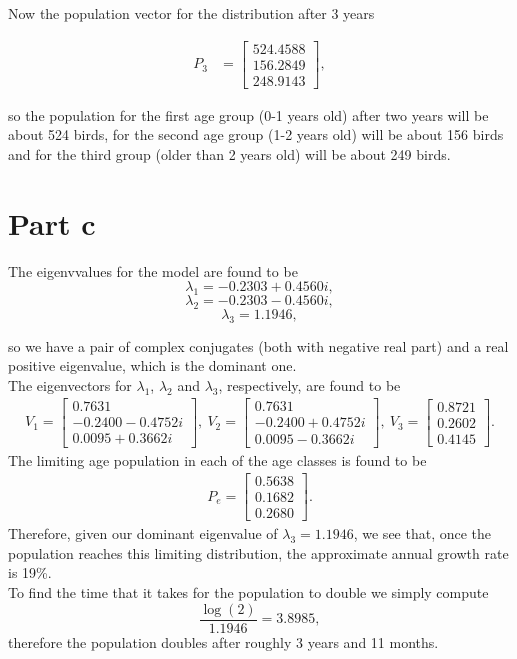 Now the population vector for the distribution after 3 years

\begin{align}
\textbf{$P_{3}$} &= \begin{bmatrix}
524.4588\\
156.2849\\
248.9143
\end{bmatrix},
\end{align}

so the population for the first age group (0-1 years old) after two years will be about 524 birds, for the second age group (1-2 years old) will be about 156 birds and for the third group (older than 2 years old) will be about 249 birds.\\

\section{Part c}
The eigenvvalues for the model are found to be
$$
\lambda_{1} = -0.2303 + 0.4560i,
$$
$$
\lambda_{2} = -0.2303 - 0.4560i,
$$
$$
\lambda_{3} = 1.1946,
$$

so we have a pair of complex conjugates (both with negative real part) and a real positive eigenvalue, which is the dominant one.\\
The eigenvectors for $\lambda_{1}$, $\lambda_{2}$ and $\lambda_{3}$, respectively, are found to be
\begin{align*}                                     \textbf{$V_{1}$} = \begin{bmatrix} 
0.7631\\
-0.2400 - 0.4752i \\
0.0095 + 0.3662i
\end{bmatrix},\
\textbf{$V_{2}$} = \begin{bmatrix}
0.7631 \\
-0.2400 + 0.4752i \\
0.0095 - 0.3662i
\end{bmatrix},\
\textbf{$V_{3}$} = \begin{bmatrix}
0.8721 \\
0.2602 \\
0.4145
\end{bmatrix}.
\end{align*}
The limiting age population in each of the age classes is found to be
\begin{align*}                                     \textbf{$P_{e}$} = \begin{bmatrix} 
0.5638\\
0.1682\\
0.2680
\end{bmatrix}.
\end{align*}
Therefore, given our dominant eigenvalue of $\lambda_{3} = 1.1946$, we see that, once the population reaches this limiting distribution, the approximate annual growth rate is 19\%.\\
To find the time that it takes for the population to double we simply compute
$$
\frac{\log(2)}{1.1946} = 3.8985,
$$
therefore the population doubles after roughly 3 years and 11 months.